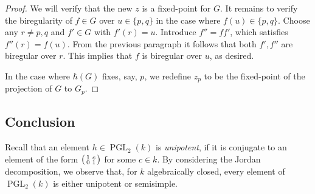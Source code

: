 \documentclass[JEP,XML,SOM,Unicode, NoEqCountersInSection,published]{cedram}
\newenvironment{smallpmatrix}{\big(\begin{smallmatrix}}{\end{smallmatrix}\big)}
\newcommand{\PGL}{\operatorname{PGL}}
\theoremstyle{plain}
\theoremstyle{definition}
\begin{document}
\begin{proof}
We will verify that the new $z$ is a fixed-point for $G$. It remains to verify the biregularity of $f \in G$ over $u\in \{p,q\}$ in the case where $f(u)\in \{p,q\}$. Choose any $r\neq p,q$ and $f'\in G$ with $f'(r)=u$. Introduce $f''=ff'$, which satisfies $f''(r)=f(u)$. From the previous paragraph it follows that both $f',f''$ are biregular over $r$. This implies that $f$ is biregular over $u$, as desired.

In the case where $\hbar(G)$ {fixes}, say, $p$, we redefine $z_p$ to be the fixed-point of the projection of $G$ to $G_p$.
\end{proof}

\subsection{Conclusion}

Recall that an element $h\in\PGL_2(k)$ is \emph{unipotent}, if it is conjugate to an element of the form $\begin{smallpmatrix}
1 & c \\
0 & 1
\end{smallpmatrix}$ for some $c\in k$. By considering the Jordan decomposition, we observe that, for $k$ algebraically closed, every element of $\PGL_2(k)$ is either unipotent or semisimple.
\end{document}
